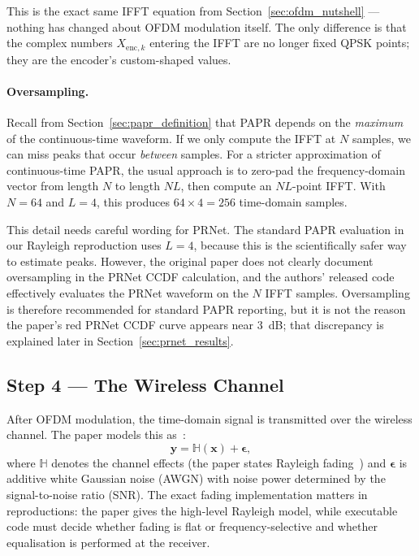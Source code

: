 This is the exact same IFFT equation from Section~\ref{sec:ofdm_nutshell}
--- nothing has changed about OFDM modulation itself.  The only difference
is that the complex numbers $X_{\mathrm{enc},k}$ entering the IFFT are
no longer fixed QPSK points; they are the encoder's custom-shaped values.

\paragraph{Oversampling.}
Recall from Section~\ref{sec:papr_definition} that PAPR depends on the
\emph{maximum} of the continuous-time waveform.  If we only compute the
IFFT at $N$ samples, we can miss peaks that occur \emph{between} samples.
For a stricter approximation of continuous-time PAPR, the usual approach is
to zero-pad the frequency-domain vector from length $N$ to length $NL$, then
compute an $NL$-point IFFT.  With $N = 64$ and $L = 4$, this produces
$64 \times 4 = 256$ time-domain samples.

This detail needs careful wording for PRNet.  The standard PAPR evaluation in
our Rayleigh reproduction uses $L = 4$, because this is the scientifically
safer way to estimate peaks.  However, the original paper does not clearly
document oversampling in the PRNet CCDF calculation, and the authors'
released code effectively evaluates the PRNet waveform on the $N$ IFFT
samples.  Oversampling is therefore recommended for standard PAPR reporting,
but it is not the reason the paper's red PRNet CCDF curve appears near
3~dB; that discrepancy is explained later in Section~\ref{sec:prnet_results}.


\subsection{Step 4 --- The Wireless Channel}

After OFDM modulation, the time-domain signal is transmitted over the wireless
channel.  The paper models this as~\cite{kim2017novel}:
\begin{equation}
    \bm{y} = \mathbb{H}(\bm{x}) + \bm{\epsilon},
    \label{eq:prnet_channel}
\end{equation}
where $\mathbb{H}$ denotes the channel effects (the paper states Rayleigh
fading~\cite{kim2017novel}) and $\bm{\epsilon}$ is additive white Gaussian
noise (AWGN) with noise power determined by the signal-to-noise ratio (SNR).
The exact fading implementation matters in reproductions: the paper gives the
high-level Rayleigh model, while executable code must decide whether fading is
flat or frequency-selective and whether equalisation is performed at the
receiver.

